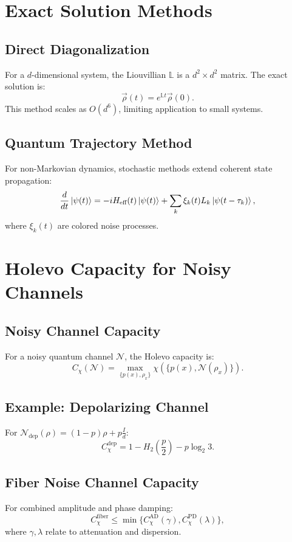 \documentclass[12pt]{article}
\begin{document}
\section{Exact Solution Methods}
\subsection{Direct Diagonalization}
For a $d$-dimensional system, the Liouvillian $\mathbb{L}$ is a $d^2 \times d^2$ matrix. The exact solution is:
\begin{equation}
    \vec{\rho}(t) = e^{\mathbb{L} t} \vec{\rho}(0).
\end{equation}
This method scales as $O(d^6)$, limiting application to small systems.

\subsection{Quantum Trajectory Method}
For non-Markovian dynamics, stochastic methods extend coherent state propagation:
\begin{equation}
    \frac{d}{dt} \ket{\psi(t)} = -i H_{\text{eff}}(t) \ket{\psi(t)} + \sum_k \xi_k(t) L_k \ket{\psi(t-\tau_k)},
\end{equation}
where $\xi_k(t)$ are colored noise processes.

\section{Holevo Capacity for Noisy Channels}
\subsection{Noisy Channel Capacity}
For a noisy quantum channel $\mathcal{N}$, the Holevo capacity is:
\begin{equation}
    C_\chi(\mathcal{N}) = \max_{\{p(x), \rho_x\}} \chi(\{p(x), \mathcal{N}(\rho_x)\}).
\end{equation}

\subsection{Example: Depolarizing Channel}
For $\mathcal{N}_{\text{dep}}(\rho) = (1-p)\rho + p \frac{I}{d}$:
\begin{equation}
    C_\chi^{\text{dep}} = 1 - H_2\left( \frac{p}{2} \right) - p \log_2 3.
\end{equation}

\subsection{Fiber Noise Channel Capacity}
For combined amplitude and phase damping:
\begin{equation}
    C_\chi^{\text{fiber}} \leq \min\{ C_\chi^{\text{AD}}(\gamma), C_\chi^{\text{PD}}(\lambda) \},
\end{equation}
where $\gamma, \lambda$ relate to attenuation and dispersion.
\end{document}
